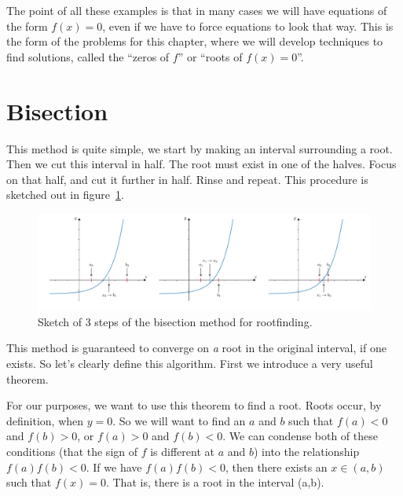 The point of all these examples is that in many cases we will have equations of the form $f(x)=0$, even if we have to force equations to look that way. This is the form of the problems for this chapter, where we will develop techniques to find solutions, called the ``zeros of $f$'' or ``roots of $f(x)=0$''.


\section{Bisection}
This method is quite simple, we start by making an interval surrounding a root. Then we cut this interval in half. The root must exist in one of the halves. Focus on that half, and cut it further in half. Rinse and repeat. This procedure is sketched out in figure~\ref{fig:ch2_bisection_sketch}.
\begin{figure}[H]
	\begin{center}
	\includegraphics[width=\textwidth]{figures/ch2_bisection_intro.pdf} 
	  \caption{Sketch of 3 steps of the bisection method for rootfinding.} \label{fig:ch2_bisection_sketch}
	\end{center}
\end{figure}

\noindent This method is guaranteed to converge on \textit{a} root in the original interval, if one exists. So let's clearly define this algorithm. First we introduce a very useful theorem.

\label{thm:ivf}

For our purposes, we want to use this theorem to find a root. Roots occur, by definition, when $y=0$. So we will want to find an $a$ and $b$ such that $f(a)<0$ and $f(b)>0$, or $f(a)>0$ and $f(b)<0$. We can condense both of these conditions (that the sign of $f$ is different at $a$ and $b$) into the relationship $f(a)f(b)<0$. If we have $f(a)f(b)<0$, then there exists an $x\in(a,b)$ such that $f(x)=0$. That is, there is a root in the interval (a,b).

